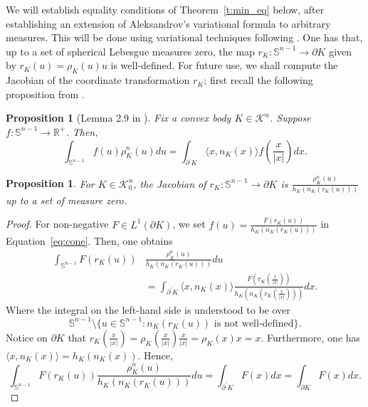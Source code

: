 \documentclass[11pt]{amsart}
\newtheorem{proposition}[theorem]{Proposition}
\theoremstyle{definition}
\theoremstyle{remark}
\numberwithin{equation}{section}
\newcommand{\R}{\mathbb{R}}
\newcommand{\s}{\mathbb{S}}
\newcommand{\conbod}{\mathcal{K}^n}
\begin{document}
	We will establish equality conditions of Theorem~\ref{t:min_eq} below, after establishing an extension of Aleksandrov's variational formula to arbitrary measures. This will be done using variational techniques following \cite{HLYZ10}. One has that, up to a set of spherical Lebesgue measures zero, the map $r_K:\s^{n-1}\to \partial K$ given by $r_K(u)=\rho_K(u)u$  is well-defined. For future use, we shall compute the Jacobian of the coordinate transformation $r_K$; first recall the following proposition from \cite{HLYZ16}.
	\begin{proposition}[Lemma 2.9 in \cite{HLYZ16}]
	Fix a convex body $K\in\conbod$. Suppose $f:\s^{n-1}\to \R^+$. Then,
	\begin{equation}
	    \label{eq:cone}
	    \int_{\s^{n-1}}f(u)\rho^n_K(u)du=\int_{\partial^\prime K}\langle x,n_K(x)\rangle f\left(\frac{x}{|x|}\right)dx.
	\end{equation}
	\end{proposition}
	
	\begin{proposition}
	\label{p:jacob}	For $K\in\conbod_0$, the Jacobian of $r_K:\s^{n-1} \to \partial K$ is $\frac{\rho^n_K(u)}{h_K(n_K(r_K(u)))}$ up to a set of measure zero.
	\end{proposition}
	\begin{proof}
	For non-negative $F\in L^1(\partial K)$, we set $f(u)=\frac{F(r_K(u))}{h_K(n_K(r_K(u)))}$ in Equation~\ref{eq:cone}. Then, one obtains
	\begin{align*}\int_{\s^{n-1}}F(r_K(u))&\frac{\rho^n_K(u)}{h_K(n_K(r_K(u)))}du
 \\
 &=\int_{\partial^\prime K}\langle x,n_K(x)\rangle \frac{F\left(r_K\left(\frac{x}{|x|}\right)\right)}{h_K\left(n_K\left(r_K\left(\frac{x}{|x|}\right)\right)\right)}dx.\end{align*}
	Where the integral on the left-hand side is understood to be over $$\s^{n-1}\setminus\{u\in\s^{n-1}: n_K(r_K(u)) \text{ is not well-defined}\}.$$
	Notice on $\partial K$ that $r_K\left(\frac{x}{|x|}\right)=\rho_K\left(\frac{x}{|x|}\right)\frac{x}{|x|}=\rho_K(x)x=x.$ Furthermore, one has $\langle x,n_K(x)\rangle=h_K(n_K(x)).$ Hence,
	$$\int_{\s^{n-1}}F(r_K(u))\frac{\rho^n_K(u)}{h_K(n_K(r_K(u)))}du=\int_{\partial^\prime K}F(x)dx=\int_{\partial K}F(x)dx.$$
	\end{proof}
	
\end{document}
